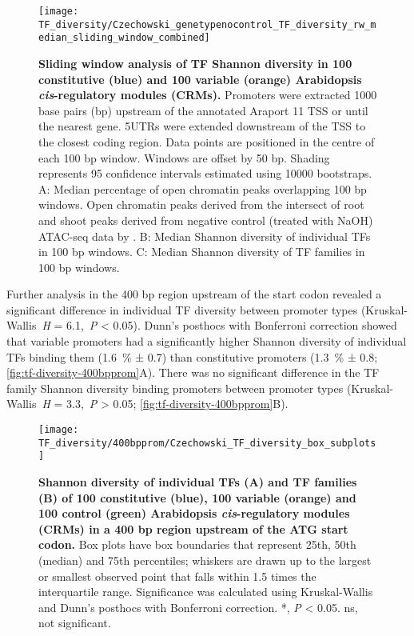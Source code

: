 \documentclass[../main.tex]{subfiles}
\begin{document}
 \begin{figure}[hbt!]
	\begin{center}
		\capstart
		\texttt{[image: TF\_diversity/Czechowski\_genetypenocontrol\_TF\_diversity\_rw\_median\_sliding\_window\_combined]}
		\caption{
			\textbf{Sliding window analysis of TF Shannon diversity in 100 constitutive (blue) and 100 variable (orange) Arabidopsis \textit{cis}\hyp{}regulatory modules (CRMs).}
			Promoters were extracted 1000 base pairs (bp) upstream of the annotated Araport 11 \autocite{chengAraport11CompleteReannotation2017} TSS or until the nearest gene.
			5UTRs were extended downstream of the TSS to the closest coding region.
			Data points are positioned in the centre of each 100 bp window.
			Windows are offset by 50 bp.
			Shading represents 95 confidence intervals estimated using 10000 bootstraps.
			A: Median percentage of open chromatin peaks overlapping 100 bp windows. Open chromatin peaks derived from the intersect of root and shoot peaks derived from negative control (treated with NaOH) ATAC\hyp{}seq data by \textcite{potterCytokininModulatesContextdependent2018}.	
			B: Median Shannon diversity of individual TFs in 100 bp windows.
			C: Median Shannon diversity of TF families in 100 bp windows.
			\label{fig:tf-diversity-sliding-window}
		}
	\end{center}
\end{figure}

Further analysis in the 400 bp region upstream of the start codon revealed a significant difference in individual TF diversity between promoter types (Kruskal\hyp{}Wallis~\textit{H} = 6.1,~\textit{P} \textless{} 0.05).
Dunn's posthocs with Bonferroni correction showed that variable promoters had a significantly higher Shannon diversity of individual TFs binding them (\SI{1.6}{\percent} ± 0.7) than constitutive promoters (\SI{1.3}{\percent} ± 0.8; \autoref{fig:tf-diversity-400bpprom}A).
There was no significant difference in the TF family Shannon diversity binding promoters between promoter types (Kruskal\hyp{}Wallis~\textit{H} = 3.3,~\textit{P} \textgreater{} 0.05; \autoref{fig:tf-diversity-400bpprom}B).


\begin{figure}[hbt!]
	\begin{center}
		\capstart
		\texttt{[image: TF\_diversity/400bpprom/Czechowski\_TF\_diversity\_box\_subplots]}
		\caption{
			\textbf{Shannon diversity of individual TFs (A) and TF families (B) of 100 constitutive (blue), 100 variable (orange) and 100 control (green) Arabidopsis \textit{cis}\hyp{}regulatory modules (CRMs) in a 400 bp region upstream of the ATG start codon.}
			Box plots have box boundaries that represent 25th, 50th (median) and 75th percentiles; whiskers are drawn up to the largest or smallest observed point that falls within 1.5 times the interquartile range.
			\label{fig:tf-diversity-400bpprom}
			Significance was calculated using Kruskal\hyp{}Wallis and Dunn's posthocs with Bonferroni correction.
			*, \textit{P} \textless{} 0.05. ns, not significant.
		}
	\end{center}
\end{figure}
\end{document}
